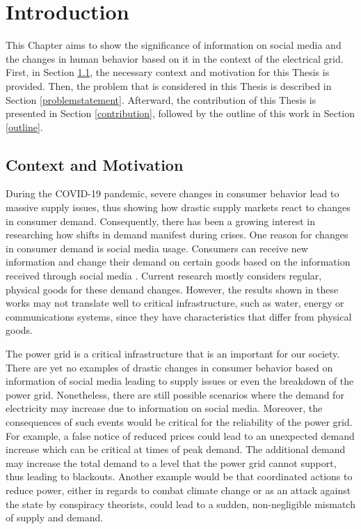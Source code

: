\chapter{Introduction}

This Chapter aims to show the significance of information on social media and 
the changes in human behavior based on it
in the context of the electrical grid.
First, in Section \ref{contextmotivation}, the necessary context and 
motivation for this Thesis is provided.
Then, the problem that is considered in this Thesis is described 
in Section \ref{problemstatement}. Afterward, the contribution of this
Thesis is presented in Section \ref{contribution}, 
followed by the outline of this work in Section \ref{outline}.

\section{Context and Motivation}
\label{contextmotivation}

During the COVID-19 pandemic, severe changes in consumer behavior
lead to massive supply issues, thus showing how drastic supply markets 
react to changes in consumer demand.
Consequently, there has been a growing interest in researching 
how shifts in demand manifest during crises. 
One reason for changes in consumer demand is 
social media usage. Consumers can receive new information
and change their demand on certain goods based on the information received 
through social media \cite{naeem2021social}.
Current research mostly considers regular, physical 
goods for these demand changes.
However, the results shown in these 
works may not translate well to critical infrastructure,
such as water, energy or communications systems,
since they have characteristics that differ from physical goods.

The power grid is a critical infrastructure 
that is an important for our society.
There are yet no examples of drastic changes in consumer behavior
based on information of social media leading to supply issues or
even the breakdown of the power grid. Nonetheless, 
there are still possible scenarios where the demand for
electricity may increase due to information on social media.
Moreover, the consequences of such events would be critical for the
reliability of the power grid.
For example, a false notice of reduced prices 
could lead to an unexpected demand increase which 
can be critical at times of peak demand. 
The additional demand
may increase the total demand to a level that the power grid
cannot support, thus leading to blackouts.
Another example would be that coordinated actions to reduce
power, either in regards to combat climate change \cite{earthday}
or as an attack against the state by conspiracy theorists,
could lead to a sudden, non-negligible mismatch of supply and demand.


